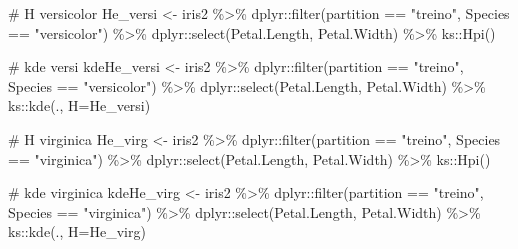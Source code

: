 \documentclass[
  a4paperpaper,
]{article}
\newenvironment{Shaded}{\begin{snugshade}}{\end{snugshade}}
\newcommand{\AttributeTok}[1]{\textcolor[rgb]{0.40,0.45,0.13}{#1}}
\newcommand{\CommentTok}[1]{\textcolor[rgb]{0.37,0.37,0.37}{#1}}
\newcommand{\FunctionTok}[1]{\textcolor[rgb]{0.28,0.35,0.67}{#1}}
\newcommand{\NormalTok}[1]{\textcolor[rgb]{0.00,0.23,0.31}{#1}}
\newcommand{\OtherTok}[1]{\textcolor[rgb]{0.00,0.23,0.31}{#1}}
\newcommand{\SpecialCharTok}[1]{\textcolor[rgb]{0.37,0.37,0.37}{#1}}
\newcommand{\StringTok}[1]{\textcolor[rgb]{0.13,0.47,0.30}{#1}}
\begin{document}
\begin{Shaded}
\begin{Highlighting}[]
\CommentTok{\# H versicolor}
\NormalTok{He\_versi }\OtherTok{\textless{}{-}}\NormalTok{ iris2 }\SpecialCharTok{\%\textgreater{}\%} 
\NormalTok{  dplyr}\SpecialCharTok{::}\FunctionTok{filter}\NormalTok{(partition }\SpecialCharTok{==} \StringTok{"treino"}\NormalTok{, Species }\SpecialCharTok{==} \StringTok{"versicolor"}\NormalTok{) }\SpecialCharTok{\%\textgreater{}\%}
\NormalTok{  dplyr}\SpecialCharTok{::}\FunctionTok{select}\NormalTok{(Petal.Length, Petal.Width) }\SpecialCharTok{\%\textgreater{}\%}
\NormalTok{  ks}\SpecialCharTok{::}\FunctionTok{Hpi}\NormalTok{()}

\CommentTok{\# kde versi}
\NormalTok{kdeHe\_versi }\OtherTok{\textless{}{-}}\NormalTok{ iris2 }\SpecialCharTok{\%\textgreater{}\%} 
\NormalTok{  dplyr}\SpecialCharTok{::}\FunctionTok{filter}\NormalTok{(partition }\SpecialCharTok{==} \StringTok{"treino"}\NormalTok{, Species }\SpecialCharTok{==} \StringTok{"versicolor"}\NormalTok{) }\SpecialCharTok{\%\textgreater{}\%}
\NormalTok{  dplyr}\SpecialCharTok{::}\FunctionTok{select}\NormalTok{(Petal.Length, Petal.Width) }\SpecialCharTok{\%\textgreater{}\%}
\NormalTok{  ks}\SpecialCharTok{::}\FunctionTok{kde}\NormalTok{(., }\AttributeTok{H=}\NormalTok{He\_versi)}

\CommentTok{\# H virginica}
\NormalTok{He\_virg }\OtherTok{\textless{}{-}}\NormalTok{ iris2 }\SpecialCharTok{\%\textgreater{}\%} 
\NormalTok{  dplyr}\SpecialCharTok{::}\FunctionTok{filter}\NormalTok{(partition }\SpecialCharTok{==} \StringTok{"treino"}\NormalTok{, Species }\SpecialCharTok{==} \StringTok{"virginica"}\NormalTok{) }\SpecialCharTok{\%\textgreater{}\%}
\NormalTok{  dplyr}\SpecialCharTok{::}\FunctionTok{select}\NormalTok{(Petal.Length, Petal.Width) }\SpecialCharTok{\%\textgreater{}\%}
\NormalTok{  ks}\SpecialCharTok{::}\FunctionTok{Hpi}\NormalTok{()}

\CommentTok{\# kde virginica}
\NormalTok{kdeHe\_virg }\OtherTok{\textless{}{-}}\NormalTok{ iris2 }\SpecialCharTok{\%\textgreater{}\%} 
\NormalTok{  dplyr}\SpecialCharTok{::}\FunctionTok{filter}\NormalTok{(partition }\SpecialCharTok{==} \StringTok{"treino"}\NormalTok{, Species }\SpecialCharTok{==} \StringTok{"virginica"}\NormalTok{) }\SpecialCharTok{\%\textgreater{}\%}
\NormalTok{  dplyr}\SpecialCharTok{::}\FunctionTok{select}\NormalTok{(Petal.Length, Petal.Width) }\SpecialCharTok{\%\textgreater{}\%}
\NormalTok{  ks}\SpecialCharTok{::}\FunctionTok{kde}\NormalTok{(., }\AttributeTok{H=}\NormalTok{He\_virg)}
\end{Highlighting}
\end{Shaded}
\end{document}
